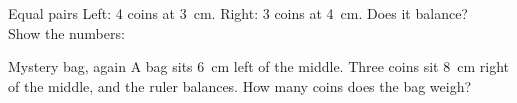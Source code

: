 \begin{puzzle}{Equal pairs}
Left: 4 coins at 3~cm. Right: 3 coins at 4~cm. Does it balance? \wline[2cm]\\
Show the numbers: \wline[3cm]
\end{puzzle}

\begin{puzzle}{Mystery bag, again}
A bag sits 6~cm left of the middle. Three coins sit 8~cm right of the middle, and the ruler balances. How many coins does the bag weigh? \wline[1.8cm]
\end{puzzle}
\clearpage

